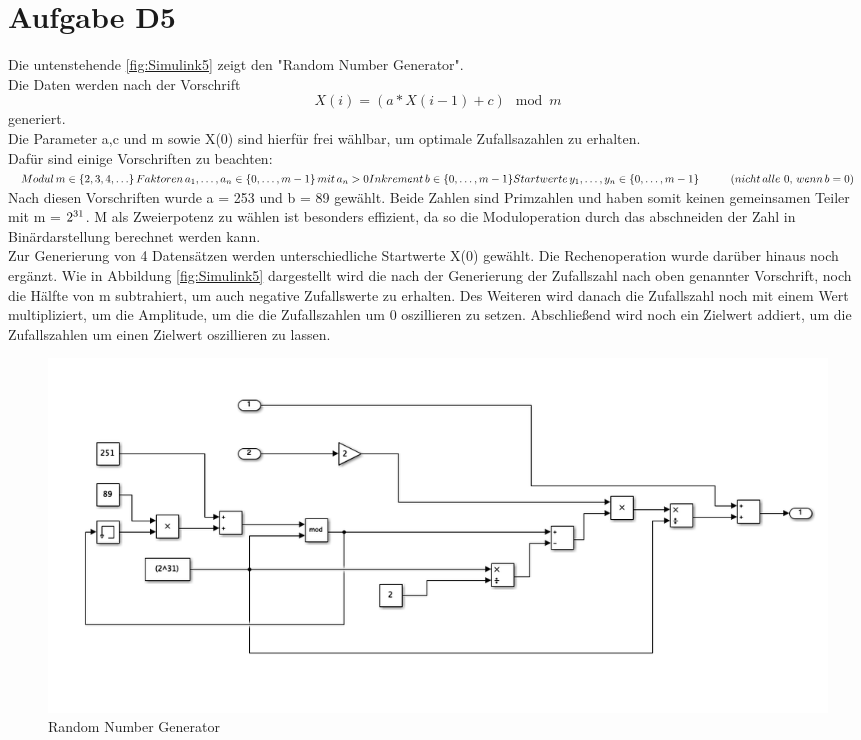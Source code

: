 
\chapter{Aufgabe D5}
Die untenstehende \autoref{fig:Simulink5} zeigt den "Random Number Generator". \\
Die Daten werden nach der Vorschrift$$ X(i) = (a*X(i-1)+c)\mod m$$ generiert.\\
Die Parameter a,c und m sowie X(0) sind hierfür frei wählbar, um optimale Zufallsazahlen zu erhalten.\\
Dafür sind einige Vorschriften zu beachten:\\ 
$ Modul \thinspace {\displaystyle m\in \{2,3,4,\ldots \}} \\
\thinspace Faktoren\thinspace {\displaystyle a_{1},\ldots ,a_{n}\in \left\{0,\ldots ,m-1\right\}}\thinspace mit \thinspace{\displaystyle a_{n}>0}\\
Inkrement\thinspace {\displaystyle b\in \left\{0,\ldots ,m-1\right\}}\\
Startwerte \thinspace{\displaystyle y_{1},\ldots ,y_{n}\in \left\{0,\ldots ,m-1\right\}} \hspace{1cm}(nicht\thinspace alle\thinspace\thinspace 0, \thinspace wenn\thinspace {\displaystyle b=0} )
$\\

Nach diesen Vorschriften wurde a = 253 und b = 89 gewählt. Beide Zahlen sind Primzahlen und haben somit keinen gemeinsamen Teiler mit m = $2\textsuperscript{31}$.
M als Zweierpotenz zu wählen ist besonders effizient, da so die Moduloperation durch das abschneiden der Zahl in Binärdarstellung berechnet werden kann.\\
Zur Generierung von 4 Datensätzen werden unterschiedliche Startwerte X(0) gewählt.
Die Rechenoperation wurde darüber hinaus noch ergänzt. Wie in Abbildung \autoref{fig:Simulink5} dargestellt wird die nach der Generierung der Zufallszahl nach oben genannter Vorschrift, noch die Hälfte von m subtrahiert, um auch negative Zufallswerte zu erhalten. Des Weiteren wird danach die Zufallszahl noch mit einem Wert multipliziert, um die Amplitude, um die die Zufallszahlen um 0 oszillieren zu setzen. Abschließend wird noch ein Zielwert addiert, um die Zufallszahlen um einen Zielwert oszillieren zu lassen.

\begin{figure}[H]
	\centering
	\includegraphics[width=1\linewidth]{../Graphiken/Simulink5}
	\caption{Random Number Generator}
	\label{fig:Simulink5}
\end{figure}